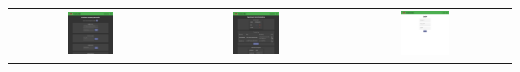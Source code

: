 \begin{tabular}{ccc}
	\includegraphics[width=0.3\textwidth]{assets/img/screenshots/13-gestione_account.png} &
	\includegraphics[width=0.3\textwidth]{assets/img/screenshots/14-dashboard.png} &
	\includegraphics[width=0.3\textwidth]{assets/img/screenshots/15-light.png} \\
\end{tabular}